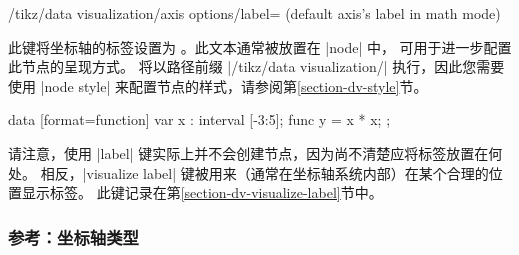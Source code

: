 \begin{key}{/tikz/data visualization/axis options/label=
  (default \normalfont axis's label in math mode)%
}

    此键将坐标轴的标签设置为 。此文本通常被放置在 |node| 中， 可用于进一步配置此节点的呈现方式。 将以路径前缀 |/tikz/data visualization/| 执行，因此您需要使用 |node style| 来配置节点的样式，请参阅第\ref{section-dv-style}节。
    
\begin{codeexample}[preamble={\usetikzlibrary{datavisualization.formats.functions}}]
\tikz \datavisualization [
    scientific axes,
    x axis = {label, length=2.5cm},
    y axis = {label={[node style={fill=blue!20}]{$x^2$}}},
    visualize as smooth line]
 data [format=function] {
   var x : interval [-3:5];
   func y = \value x * \value x;
 };
\end{codeexample}
\end{key}


请注意，使用 |label| 键实际上并不会创建节点，因为尚不清楚应将标签放置在何处。 相反，|visualize label| 键被用来（通常在坐标轴系统内部）在某个合理的位置显示标签。 此键记录在第\ref{section-dv-visualize-label}节中。


\subsubsection{参考：坐标轴类型}
\label{section-dv-reference-axis-types}

